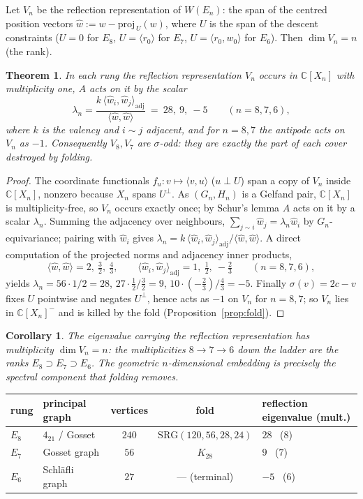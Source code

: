 \documentclass[11pt]{article}
\newtheorem{theorem}{Theorem}
\newtheorem{corollary}{Corollary}
\theoremstyle{remark}
\newcommand{\CC}{\mathbb{C}}
\newcommand{\Weyl}{W}
\newcommand{\ip}[2]{\langle #1,#2\rangle}
\newcommand{\hw}{\hat w}
\begin{document}
Let $V_n$ be the reflection representation of $\Weyl(E_n)$: the span of the
centred position vectors $\hw:=w-\mathrm{proj}_{\,U}(w)$, where $U$ is the span
of the descent constraints ($U=0$ for $E_8$, $U=\langle r_0\rangle$ for $E_7$,
$U=\langle r_0,w_0\rangle$ for $E_6$). Then $\dim V_n=n$ (the rank).

\begin{theorem}\label{thm:refl}
In each rung the reflection representation $V_n$ occurs in $\CC[X_n]$ with
multiplicity one, $A$ acts on it by the scalar
\[
  \lambda_n=\frac{k\,\langle \hw_i,\hw_j\rangle_{\mathrm{adj}}}{\langle\hw,\hw\rangle}
  \ =\ 28,\ 9,\ -5\qquad(n=8,7,6),
\]
where $k$ is the valency and $i\sim j$ adjacent, and for $n=8,7$ the antipode
acts on $V_n$ as $-1$. Consequently $V_8,V_7$ are $\sigma$-odd: they are exactly
the part of each cover destroyed by folding.
\end{theorem}

\begin{proof}
The coordinate functionals $f_u:v\mapsto\ip{v}{u}$ ($u\perp U$) span a copy of
$V_n$ inside $\CC[X_n]$, nonzero because $X_n$ spans $U^{\perp}$. As
$(G_n,H_n)$ is a Gelfand pair, $\CC[X_n]$ is multiplicity-free, so $V_n$ occurs
exactly once; by Schur's lemma $A$ acts on it by a scalar $\lambda_n$. Summing
the adjacency over neighbours, $\sum_{j\sim i}\hw_j=\lambda_n\hw_i$ by
$G_n$-equivariance; pairing with $\hw_i$ gives
$\lambda_n=k\,\langle\hw_i,\hw_j\rangle_{\mathrm{adj}}/\langle\hw,\hw\rangle$.
A direct computation of the projected norms and adjacency inner products,
\[
  \langle\hw,\hw\rangle=2,\ \tfrac32,\ \tfrac43,\qquad
  \langle\hw_i,\hw_j\rangle_{\mathrm{adj}}=1,\ \tfrac12,\ -\tfrac23
  \qquad(n=8,7,6),
\]
yields $\lambda_n=56\cdot1/2=28$, $27\cdot\tfrac12/\tfrac32=9$,
$10\cdot(-\tfrac23)/\tfrac43=-5$. Finally $\sigma(v)=2c-v$ fixes $U$ pointwise
and negates $U^{\perp}$, hence acts as $-1$ on $V_n$ for $n=8,7$; so $V_n$ lies
in $\CC[X_n]^{-}$ and is killed by the fold (Proposition~\ref{prop:fold}).
\end{proof}

\begin{corollary}
The eigenvalue carrying the reflection representation has multiplicity
$\dim V_n=n$: the multiplicities $8\to7\to6$ down the ladder are the ranks
$E_8\supset E_7\supset E_6$. The geometric $n$-dimensional embedding is precisely
the spectral component that folding removes.
\end{corollary}

\begin{center}
\begin{tabular}{llccl}
\toprule
rung & principal graph & vertices & fold & reflection eigenvalue (mult.) \\
\midrule
$E_8$ & $4_{21}$ / Gosset & $240$ & $\mathrm{SRG}(120,56,28,24)$ & $28$ \ ($8$) \\
$E_7$ & Gosset graph      & $56$  & $K_{28}$                      & $9$  \ ($7$) \\
$E_6$ & Schl\"afli graph  & $27$  & --- (terminal)                & $-5$ \ ($6$) \\
\bottomrule
\end{tabular}
\end{center}
\end{document}
